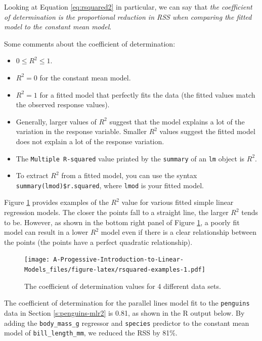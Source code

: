 \documentclass[
]{book}
\providecommand{\tightlist}{%
  \setlength{\itemsep}{0pt}\setlength{\parskip}{0pt}}
\theoremstyle{definition}
\theoremstyle{definition}
\theoremstyle{definition}
\theoremstyle{definition}
\theoremstyle{remark}
\begin{document}
Looking at Equation \eqref{eq:rsquared2} in particular, we can say that \emph{the coefficient of determination is the proportional reduction in RSS when comparing the fitted model to the constant mean model}.

Some comments about the coefficient of determination:

\begin{itemize}
\tightlist
\item
  \(0\leq R^2 \leq 1\).
\item
  \(R^2=0\) for the constant mean model.
\item
  \(R^2=1\) for a fitted model that perfectly fits the data (the fitted values match the observed response values).
\item
  Generally, larger values of \(R^2\) suggest that the model explains a lot of the variation in the response variable. Smaller \(R^2\) values suggest the fitted model does not explain a lot of the response variation.
\item
  The \texttt{Multiple\ R-squared} value printed by the \texttt{summary} of an \texttt{lm} object is \(R^2\).
\item
  To extract \(R^2\) from a fitted model, you can use the syntax \texttt{summary(lmod)\$r.squared}, where \texttt{lmod} is your fitted model.
\end{itemize}

Figure \ref{fig:rsquared-examples} provides examples of the \(R^2\) value for various fitted simple linear regression models. The closer the points fall to a straight line, the larger \(R^2\) tends to be. However, as shown in the bottom right panel of Figure \ref{fig:rsquared-examples}, a poorly fit model can result in a lower \(R^2\) model even if there is a clear relationship between the points (the points have a perfect quadratic relationship).

\begin{figure}
\centering
\texttt{[image: A-Progessive-Introduction-to-Linear-Models\_files/figure-latex/rsquared-examples-1.pdf]}
\caption{\label{fig:rsquared-examples}The coefficient of determination values for 4 different data sets.}
\end{figure}

The coefficient of determination for the parallel lines model fit to the \texttt{penguins} data in Section \ref{s:penguins-mlr2} is 0.81, as shown in the R output below. By adding the \texttt{body\_mass\_g} regressor and \texttt{species} predictor to the constant mean model of \texttt{bill\_length\_mm}, we reduced the RSS by 81\%.
\end{document}
